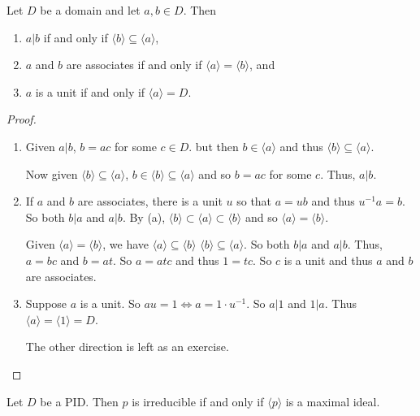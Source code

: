 \begin{lemma}
	Let $D$ be a domain and let $a,b\in D$. Then
	\begin{enumerate}
		\item $a|b$ if and only if $\langle b\rangle\subseteq\langle a\rangle$,
		\item $a$ and $b$ are associates if and only if $\langle a\rangle=\langle b\rangle$, and
		\item $a$ is a unit if and only if $\langle a\rangle=D$. 
	\end{enumerate}
\end{lemma}

\begin{proof} \phantom{x}
	\begin{enumerate}[label=\textbf{(\alph*)}]
		\item Given $a|b$, $b=ac$ for some $c\in D$. but then $b\in\langle a\rangle$ and thus $\langle b\rangle\subseteq\langle a\rangle$.

		Now given $\langle b\rangle\subseteq\langle a\rangle$, $b\in\langle b\rangle\subseteq\langle a\rangle$ and so $b=ac$ for some $c$. Thus, $a|b$.

		\item If $a$ and $b$ are associates, there is a unit $u$ so that $a=ub$ and thus $u^{-1}a=b$. So both $b|a$ and $a|b$. By (a), $\langle b\rangle\subset\langle a\rangle\subset\langle b\rangle$ and so $\langle a\rangle =\langle b\rangle$.

		Given $\langle a\rangle =\langle b\rangle$, we have $\langle a\rangle\subseteq\langle b\rangle$ $\langle b\rangle\subseteq\langle a\rangle$. So both $b|a$ and $a|b$. Thus, $a=bc$ and $b=at$. So $a=atc$ and thus $1=tc$. So $c$ is a unit and thus $a$ and $b$ are associates.

		\item Suppose $a$ is a unit. So $au=1\Leftrightarrow a=1\cdot u^{-1}$. So $a|1$ and $1|a$. Thus $\langle a\rangle=\langle 1\rangle =D$.

		The other direction is left as an exercise.
	\end{enumerate}
\end{proof}

\begin{theorem}\label{thm:irr_equiv_max_ideal}
	Let $D$ be a PID. Then $p$ is irreducible if and only if $\langle p\rangle$ is a maximal ideal.
\end{theorem}


